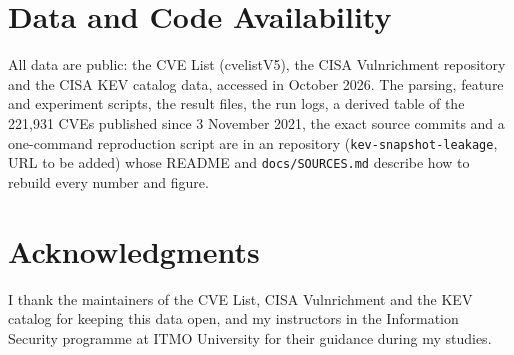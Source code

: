 \documentclass[conference,a4paper]{IEEEtran}
\newif\ifanon
\begin{document}
\section*{Data and Code Availability}

All data are public: the CVE List (cvelistV5), the CISA Vulnrichment repository and the CISA KEV catalog data, accessed in October 2026. The parsing, feature and experiment scripts, the result files, the run logs, a derived table of the 221,931 CVEs published since 3 November 2021, the exact source commits and a one-command reproduction script are in an \ifanon anonymous \fi repository \ifanon available at \url{ANONYMOUS_REPO_URL}\else (\texttt{kev-snapshot-leakage}, URL to be added) \fi whose README and \texttt{docs/SOURCES.md} describe how to rebuild every number and figure.

\section*{Acknowledgments}

\ifanon
\else
I thank the maintainers of the CVE List, CISA Vulnrichment and the KEV catalog for keeping this data open, and my instructors in the Information Security programme at ITMO University for their guidance during my studies.
\fi
\end{document}
